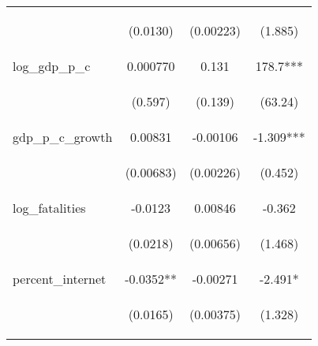 \documentclass{article}
\begin{document}
\begin{table}[htbp]
{\begin{tabular}{lccc}
\vspace{4pt} & \begin{footnotesize}(0.0130)\end{footnotesize} & \begin{footnotesize}(0.00223)\end{footnotesize} & \begin{footnotesize}(1.885)\end{footnotesize} \\
log\_gdp\_p\_c & 0.000770 & 0.131 & 178.7*** \\
\vspace{4pt} & \begin{footnotesize}(0.597)\end{footnotesize} & \begin{footnotesize}(0.139)\end{footnotesize} & \begin{footnotesize}(63.24)\end{footnotesize} \\
gdp\_p\_c\_growth & 0.00831 & -0.00106 & -1.309*** \\
\vspace{4pt} & \begin{footnotesize}(0.00683)\end{footnotesize} & \begin{footnotesize}(0.00226)\end{footnotesize} & \begin{footnotesize}(0.452)\end{footnotesize} \\
log\_fatalities & -0.0123 & 0.00846 & -0.362 \\
\vspace{4pt} & \begin{footnotesize}(0.0218)\end{footnotesize} & \begin{footnotesize}(0.00656)\end{footnotesize} & \begin{footnotesize}(1.468)\end{footnotesize} \\
percent\_internet & -0.0352** & -0.00271 & -2.491* \\
\vspace{4pt} & \begin{footnotesize}(0.0165)\end{footnotesize} & \begin{footnotesize}(0.00375)\end{footnotesize} & \begin{footnotesize}(1.328)\end{footnotesize} \\

\end{tabular}}
\end{table}
\end{document}
